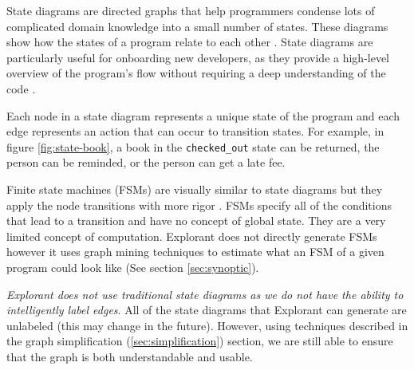State diagrams are directed graphs that help programmers condense lots of complicated domain knowledge into a small number of states. These diagrams show how the states of a program relate to each other \cite{state}. State diagrams are particularly useful for onboarding new developers, as they provide a high-level overview of the program's flow without requiring a deep understanding of the code \cite{onboarding-ramp, state}.


Each node in a state diagram represents a unique state of the program and each edge represents an action that can occur to transition states. For example, in figure \ref{fig:state-book}, a book in the \texttt{checked\_out} state can be returned, the person can be reminded, or the person can get a late fee. 


Finite state machines (FSMs) are visually similar to state diagrams but they apply the node transitions with more rigor \cite[p~55]{fsm}. FSMs specify all of the conditions that lead to a transition and have no concept of global state. They are a very limited concept of computation. Explorant does not directly generate FSMs however it uses graph mining techniques to estimate what an FSM of a given program could look like (See section \ref{sec:synoptic}).




\textit{Explorant does not use traditional state diagrams as we do not have the ability to intelligently label edges}. All of the state diagrams that Explorant can generate are unlabeled (this may change in the future). However, using techniques described in the graph simplification (\ref{sec:simplification}) section, we are still able to ensure that the graph is both understandable and usable. 

